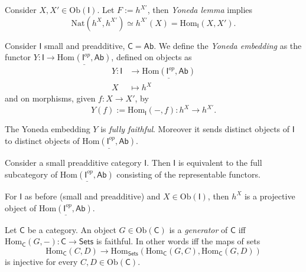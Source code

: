 \begin{rem}
	Consider $X, X' \in \mathrm{Ob} \left(\mathsf{I}\right)$. 
	Let $F := h^{X'}$, then {\em Yoneda lemma} implies
	\begin{equation}
		\mathrm{Nat} \left( h^X, h^{X'} \right) \simeq h^{X'}(X) = \mathrm{Hom}_{\mathsf{I}} \left( X, X' \right)
	.\end{equation} 
\end{rem}

\begin{defn}
	Consider $\mathsf{I}$ small and preadditive, $\mathsf{C} = \mathsf{Ab}$.
	We define the {\em Yoneda embedding} as the functor
	$Y: \mathsf{I} \to \underline{\mathrm{Hom}_{\mathsf{}} \left( \mathsf{I}^{op}, \mathsf{Ab} \right)}$,
	defined on objects as
	\begin{align}
	Y: \mathsf{I} &\to \underline{\mathrm{Hom} \left( \mathsf{I}^{op}, \mathsf{Ab} \right)} \\
		X &\mapsto h^X
	\end{align} 
	and on morphisms, given $f: X \to X'$, by
	\begin{equation}
		Y(f):= \mathrm{Hom}_{\mathsf{I}} \left( -, f \right): h^X \to h^{X'}
	.\end{equation} 
\end{defn}

\begin{prop}
	The Yoneda embedding $Y$ is {\em fully faithful}.
	Moreover it sends distinct objects of $\mathsf{I}$ to distinct objects of
	$\underline{\mathrm{Hom}\left( \mathsf{I}^{op}, \mathsf{Ab} \right)}$.
\end{prop} 

\begin{cor}
	Consider a small preadditive category $\mathsf{I}$.
	Then $\mathsf{I}$ is equivalent to the full subcategory of
	$\underline{\mathrm{Hom}\left( \mathsf{I}^{op}, \mathsf{Ab} \right)}$ 
	consisting of the representable functors.
\end{cor} 

\begin{prop}
	For $\mathsf{I}$ as before (small and preadditive) and
	$X \in \mathrm{Ob} \left(\mathsf{I}\right)$, then
	$h^X$ is a projective object of 
	$\underline{\mathrm{Hom} \left( \mathsf{I}^{op}, \mathsf{Ab} \right)}$.
\end{prop} 

\begin{defn}
	Let $\mathsf{C}$ be a category.
	An object $G \in \mathrm{Ob} \left(\mathsf{C}\right)$ is a {\em generator} of $\mathsf{C}$ iff
	$\mathrm{Hom}_{\mathsf{C}} \left( G, - \right): \mathsf{C} \to \mathsf{Sets}$ is faithful.
	In other words iff the maps of sets
	 \begin{equation}
	\mathrm{Hom}_{\mathsf{C}} \left( C, D \right) \to
	\mathrm{Hom}_{\mathsf{Sets}} \left( \mathrm{Hom}_{\mathsf{C}} \left( G, C \right), 
	\mathrm{Hom}_{\mathsf{C}} \left( G, D \right) \right)
	\end{equation} 
	is injective for every $C, D \in \mathrm{Ob} \left(\mathsf{C}\right)$.
\end{defn}

